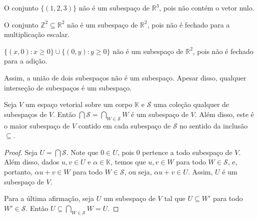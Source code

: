 \begin{example}
    O conjunto $\{(1, 2, 3)\}$ não é um subespaço de $\mathbb R^3$, pois não contém o vetor nulo.
\end{example}
\begin{example}
    O conjunto $\mathbb Z^2\subseteq \mathbb R^2$ não é um subespaço de $\mathbb R^2$, pois não é fechado para a multiplicação escalar.
\end{example}
\begin{example}
    $\{(x, 0): x \geq 0\}\cup\{(0, y): y \geq 0\}$ não é um subespaço de $\mathbb R^2$, pois não é fechado para a adição.
\end{example}
Assim, a união de dois subespaços não é um subespaço.
Apesar disso, qualquer interseção de subespaços é um subespaço.
\begin{proposition}\label{prop:intersecaoSubespacos}
    Seja $V$ um espaço vetorial sobre um corpo $\mathbb K$ e $\mathcal S$ uma coleção qualquer de subespaços de $V$.
    Então $\bigcap \mathcal S=\bigcap_{W \in \mathcal S} W$ é um subespaço de $V$.
    Além disso, este é o maior subespaço de $V$ contido em cada subespaço de $\mathcal S$ no sentido da inclusão $\subseteq$.
\end{proposition}
\begin{proof}
    Seja $U=\bigcap \mathcal S$.
    Note que $0 \in U$, pois $0$ pertence a todo subespaço de $V$.
    Além disso, dados $u, v \in U$ e $\alpha \in \mathbb K$, temos que $u, v \in W$ para todo $W \in \mathcal S$, e, portanto, $\alpha u + v \in W$ para todo $W \in \mathcal S$, ou seja, $\alpha u + v \in U$.
    Assim, $U$ é um subespaço de $V$.

    Para a última afirmação, seja $U$ um subespaço de $V$ tal que $U \subseteq W'$ para todo $W' \in \mathcal S$.
    Então $U \subseteq \bigcap_{W \in \mathcal S} W = U$.
\end{proof}